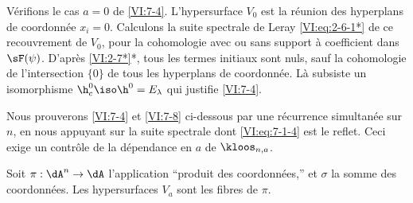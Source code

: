 Vérifions le cas $a=0$ de \ref{VI:7-4}. L'hypersurface $V_0$ est la réunion 
des hyperplans de coordonnée $x_i=0$. Calculons la suite spectrale de Leray 
\eqref{VI:eq:2-6-1*} de ce recouvrement de $V_0$, pour la cohomologie avec ou 
sans support à coefficient dans $\sF(\psi)$. D'après \ref{VI:2-7*}*, tous 
les termes initiaux sont nuls, sauf la cohomologie de l'intersection $\{0\}$ de 
tous les hyperplans de coordonnée. Là subsiste un isomorphisme 
$\h_c^0{}\iso \h^0{}=E_\lambda$ qui justifie \ref{VI:7-4}. 

Nous prouverons \ref{VI:7-4} et \ref{VI:7-8} ci-dessous par une récurrence 
simultanée sur $n$, en nous appuyant sur la suite spectrale dont 
\eqref{VI:eq:7-1-4} est le reflet. Ceci exige un contrôle de la dépendance 
en $a$ de $\kloos_{n,a}$. 

Soit $\pi:\dA^n \to \dA$ l'application ``produit des coordonnées,'' et 
$\sigma$ la somme des coordonnées. Les hypersurfaces $V_a$ sont les fibres de 
$\pi$. 





